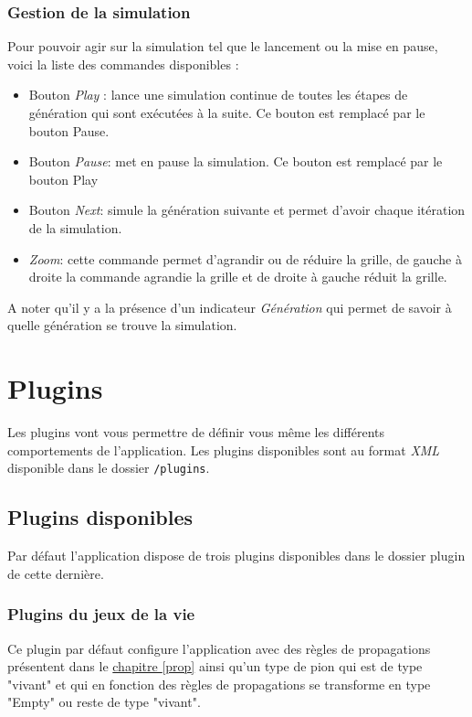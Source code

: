 \documentclass[pdftex,12pt,a4paper]{article}
\newcommand{\commande}[1]{\texttt{#1}}
\begin{document}
     	\subsubsection{Gestion de la simulation}
    Pour pouvoir agir sur la simulation tel que le lancement ou la mise en pause, voici la liste des commandes disponibles : 
   		\begin{itemize}
        	\item Bouton \emph{Play} : lance une simulation continue de toutes les étapes de génération qui sont exécutées à la suite. Ce bouton est remplacé par le bouton Pause.
            \item Bouton \emph{Pause}: met en pause la simulation. Ce bouton est remplacé par le bouton Play 
            \item Bouton \emph{Next}: simule la génération suivante et permet d'avoir chaque itération de la simulation.
            \item \emph{Zoom}: cette commande permet d'agrandir ou de réduire la grille, de gauche à droite la commande agrandie la grille et de droite à gauche réduit la grille. \\
        \end{itemize}
 A noter qu'il y a la présence d'un indicateur \emph{Génération} qui permet de savoir à quelle génération
se trouve la simulation.  

	\newpage
  	 \section{Plugins}\label{plugin}
   
   	 Les plugins vont vous permettre de définir vous même les différents comportements de l'application. Les plugins disponibles sont au format \emph{XML} disponible dans le dossier \commande{/plugins}.
     
		\subsection{Plugins disponibles}
		
       Par défaut l'application dispose de trois plugins disponibles dans le dossier plugin de cette dernière.
       
       \subsubsection{Plugins du jeux de la vie}
       
 	Ce plugin par défaut configure l'application avec des règles de propagations présentent dans le \hyperref[prop]{chapitre \ref{prop}} ainsi qu'un type de pion qui est de type "vivant" et qui en fonction des règles de propagations se transforme en type "Empty" ou reste de type "vivant".
    
\end{document}
